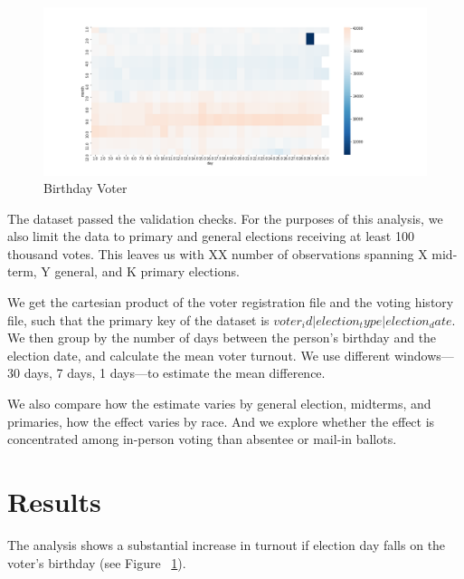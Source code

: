 \documentclass[12pt, letterpaper]{article}
\begin{document}
\begin{figure}[H]
\centering
 \includegraphics[width=\textwidth]{../figs/fig2_bday_count_by_month_day.png}
 \caption{Birthday Voter}
 \label{fig:birthday}
\end{figure}

The dataset passed the validation checks. For the purposes of this analysis, we also limit the data to primary and general elections receiving at least 100 thousand votes. This leaves us with XX number of observations spanning X mid-term, Y general, and K primary elections. 






We get the cartesian product of the voter registration file and the voting history file, such that the primary key of the dataset is $voter_id | election_type | election_date$. We then group by the number of days between the person's birthday and the election date, and calculate the mean voter turnout. We use different windows---30 days, 7 days, 1 days---to estimate the mean difference.

We also compare how the estimate varies by general election, midterms, and primaries, how the effect varies by race. And we explore whether the effect is concentrated among in-person voting than absentee or mail-in ballots.

\section{Results}
The analysis shows a substantial increase in turnout if election day falls on the voter's birthday (see Figure ~\ref{fig:birthday}).
\end{document}
